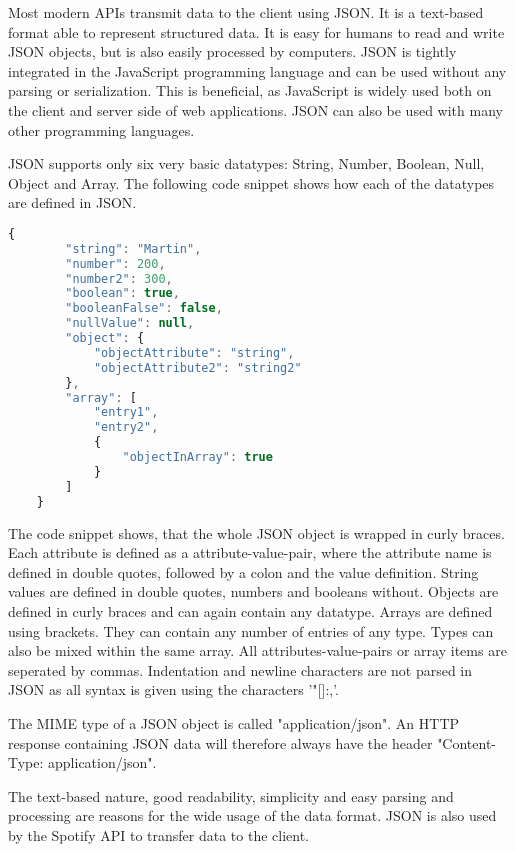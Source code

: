 Most modern APIs transmit data to the client using \ac{JSON}.
It is a text-based format able to represent structured data. \cite{MozillaJSON}
It is easy for humans to read and write JSON objects, but is also easily processed by computers.
JSON is tightly integrated in the JavaScript programming language and can be used without any parsing or serialization.\cite{OracleJSON}
This is beneficial, as JavaScript is widely used both on the client and server side of web applications. 
JSON can also be used with many other programming languages. \cite{JsonOrgIntroduction}

JSON supports only six very basic datatypes: String, Number, Boolean, Null, Object and Array.\cite{OracleJSON}
The following code snippet shows how each of the datatypes are defined in JSON.

\begin{lstlisting}[language=JavaScript]
    {
        "string": "Martin",
        "number": 200,
        "number2": 300,
        "boolean": true,
        "booleanFalse": false,
        "nullValue": null,
        "object": {
            "objectAttribute": "string",
            "objectAttribute2": "string2"
        },
        "array": [
            "entry1",
            "entry2",
            {
                "objectInArray": true
            }
        ]
    }
\end{lstlisting}

The code snippet shows, that the whole JSON object is wrapped in curly braces.
Each attribute is defined as a attribute-value-pair, where the attribute name is defined in 
double quotes, followed by a colon and the value definition. String values are defined in 
double quotes, numbers and booleans without. Objects are defined in curly braces and can
again contain any datatype.
Arrays are defined using brackets. They can contain any number of entries of any type.
Types can also be mixed within the same array.
All attributes-value-pairs or array items are seperated by commas.
Indentation and newline characters are not parsed in JSON as all syntax is given using
the characters '"{}[]:,'.\cite{JsonOrgIntroduction}

The MIME type of a JSON object is called "application/json".
An HTTP response containing JSON data will therefore always have the header
"Content-Type: application/json".\cite[Chapter 2]{richardson2008restful}

The text-based nature, good readability, simplicity and easy parsing and processing are reasons
for the wide usage of the data format. \cite{OracleJSON}
JSON is also used by the Spotify API to transfer data to the client.\cite{SpotifyWebAPI}

